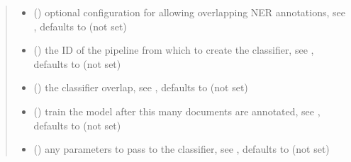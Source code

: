 \documentclass[letterpaper,10pt,english]{sphinxmanual}
\begin{document}
\begin{fulllineitems}
\begin{quote}
\begin{description}
\begin{itemize}
\item {} 
 () \textendash{} optional configuration for allowing overlapping NER
annotations, see {\hyperref[\detokenize{autoapi/pine/client/index:pine.client.CollectionBuilder.allow_overlapping_ner_annotations}]{}},
defaults to  (not set)

\item {} 
 (\sphinxstyleliteralemphasis{\sphinxupquote{, }}) \textendash{} the ID of the pipeline from which to create the classifier,
see {\hyperref[\detokenize{autoapi/pine/client/index:pine.client.CollectionBuilder.classifier}]{}}, defaults to  (not set)

\item {} 
 (\sphinxstyleliteralemphasis{\sphinxupquote{, }}) \textendash{} the classifier overlap, see {\hyperref[\detokenize{autoapi/pine/client/index:pine.client.CollectionBuilder.classifier}]{}}, defaults to  (not set)

\item {} 
 (\sphinxstyleliteralemphasis{\sphinxupquote{, }}) \textendash{} train the model after this many documents are annotated,
see {\hyperref[\detokenize{autoapi/pine/client/index:pine.client.CollectionBuilder.classifier}]{}}, defaults to  (not set)

\item {} 
 (\sphinxstyleliteralemphasis{\sphinxupquote{, }}) \textendash{} any parameters to pass to the classifier,
see {\hyperref[\detokenize{autoapi/pine/client/index:pine.client.CollectionBuilder.classifier}]{}}, defaults to  (not set)


\end{itemize}
\end{description}
\end{quote}
\end{fulllineitems}
\end{document}
